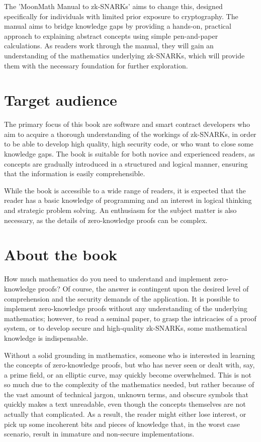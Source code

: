 The 'MoonMath Manual to zk-SNARKs' aims to change this, designed specifically for individuals with limited prior exposure to cryptography. The manual aims to bridge knowledge gaps by providing a hands-on, practical approach to explaining abstract concepts using simple pen-and-paper calculations. As readers work through the manual, they will gain an understanding of the mathematics underlying zk-SNARKs, which will provide them with the necessary foundation for further exploration.

\section{Target audience}
The primary focus of this book are software and smart contract developers who aim to acquire a thorough understanding of the workings of zk-SNARKs, in order to be able to develop high quality, high security code, or who want to close some knowledge gaps. The book is suitable for both novice and experienced readers, as concepts are gradually introduced in a structured and logical manner, ensuring that the information is easily comprehensible.

While the book is accessible to a wide range of readers, it is expected that the reader has a basic knowledge of programming and an interest in logical thinking and strategic problem solving. An enthusiasm for the subject matter is also necessary, as the details of zero-knowledge proofs can be complex. 


\section{About the book}
How much mathematics do you need to understand and implement zero-knowledge proofs? Of course, the answer is contingent upon the desired level of comprehension and the security demands of the application. It is possible to implement zero-knowledge proofs without any understanding of the underlying mathematics; however, to read a seminal paper, to grasp the intricacies of a proof system, or to develop secure and high-quality zk-SNARKs, some mathematical knowledge is indispensable.

Without a solid grounding in mathematics, someone who is interested in learning the concepts of zero-knowledge proofs, but who has never seen or dealt with, say, a prime field, or an elliptic curve, may quickly become overwhelmed. This is not so much due to the complexity of the mathematics needed, but rather because of the vast amount of technical jargon, unknown terms, and obscure symbols that quickly makes a text unreadable, even though the concepts themselves are not actually that complicated. As a result, the reader might either lose interest, or pick up some incoherent bits and pieces of knowledge that, in the worst case scenario, result in immature and non-secure implementations. 

